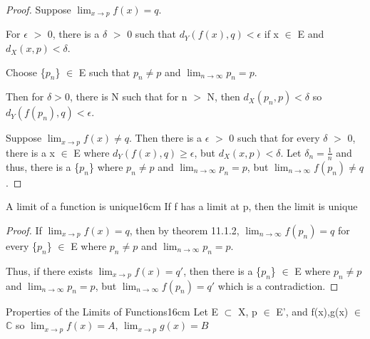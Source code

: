     \begin{proof}
        Suppose $\lim_{x \rightarrow p} f(x) = q$.

        For $\epsilon$ $>$ 0, there is a $\delta$ $>$ 0 such that
        $d_Y(f(x),q) < \epsilon$ if x $\in$ E and $d_X(x,p) < \delta$.

        Choose \{$p_n$\} $\in$ E such that $p_n \not = p$
        and $\lim_{n \rightarrow \infty} p_n = p$.

        Then for $\delta > 0$, there is N such that for n $>$ N, then
        $d_X(p_n,p)< \delta$ so $d_Y(f(p_n),q) < \epsilon$.

        \vspace{0.2cm}

        Suppose $\lim_{x \rightarrow p} f(x) \not = q$.
        Then there is a $\epsilon$ $>$ 0 such that for every $\delta$ $>$ 0,
        there is a x $\in$ E where $d_Y(f(x),q) \geq \epsilon$, but
        $d_X(x,p) < \delta$.
        Let $\delta_n = \frac{1}{n}$ and thus, there is a \{$p_n$\}
        where $p_n \not = p$ and $\lim_{n \rightarrow \infty} p_n = p$,
        but $\lim_{n \rightarrow \infty} f(p_n) \not = q$.
    \end{proof}

    \vspace{0.5cm}



    \begin{corollary}{A limit of a function is unique}{16cm}
        If f has a limit at p, then the limit is unique
    \end{corollary}

    \begin{proof}
        If $\lim_{x \rightarrow p} f(x) = q$, then by {\color{red} theorem 11.1.2},
        $\lim_{n \rightarrow \infty} f(p_n) = q$ for every
        \{$p_n$\} $\in$ E where $p_n \not = p$ and
        $\lim_{n \rightarrow \infty} p_n = p$.

        Thus, if there exists $\lim_{x \rightarrow p} f(x) = q'$, then there is
        a \{$p_n$\} $\in$ E where $p_n \not = p$ and
        $\lim_{n \rightarrow \infty} p_n = p$, but
        $\lim_{n \rightarrow \infty} f(p_n) = q'$ which is a contradiction.
    \end{proof}

    \vspace{0.5cm}



    \begin{wtheorem}{Properties of the Limits of Functions}{16cm}
        Let E $\subset$ X, p $\in$ E', and f(x),g(x) $\in$ $\mathbb{C}$ so 
        $\lim_{x \rightarrow p} f(x) = A$, $\lim_{x \rightarrow p} g(x) = B$
    \end{wtheorem}


